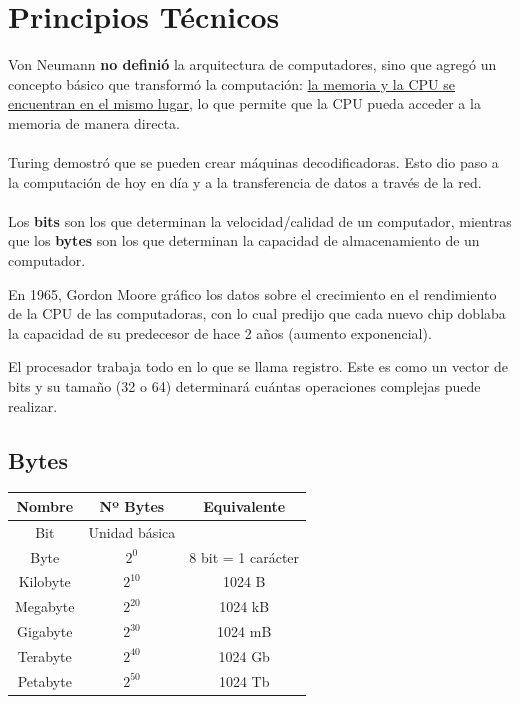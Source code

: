 \documentclass{templateNote}
\begin{document}
\section{Principios Técnicos}
\noindent Von Neumann \textbf{no definió} la arquitectura de computadores, sino que agregó un concepto básico que transformó la computación: \underline{la memoria y la CPU se encuentran en el mismo lugar}, lo que permite que la CPU pueda acceder a la memoria de manera directa. 
\\\\
Turing demostró que se pueden crear máquinas decodificadoras. Esto dio paso a la computación de hoy en día y a la transferencia de datos a través de la red.
\\\\
Los \textbf{bits} son los que determinan la velocidad/calidad de un computador, mientras que los \textbf{bytes} son los que determinan la capacidad de almacenamiento de un computador.

\begin{tcolorbox}[colback=blue!5!white,colframe=blue!75!black,title=Ley de Moore]
En 1965, Gordon Moore gráfico los datos sobre el crecimiento en el rendimiento de la CPU de las computadoras, con lo cual predijo que cada nuevo chip doblaba la capacidad de su predecesor de hace 2 años (aumento exponencial).
\end{tcolorbox}

\noindent El procesador trabaja todo en lo que se llama registro. Este es como un vector de bits y su tamaño (32 o 64) determinará cuántas operaciones complejas puede realizar.

\subsection{Bytes}
\begin{table} [h]
    \centering
        \renewcommand{\arraystretch}{1.5} %
        \begin{tabular}{|c|c|c|}
            \hline
            \textbf{Nombre} & \textbf{Nº Bytes} & \textbf{Equivalente}\\
            \hline
            Bit & Unidad básica &\\
            \hline
            Byte & $\displaystyle 2^0$ & 8 bit = 1 carácter \\
            \hline
            Kilobyte & $\displaystyle 2^{10}$ & 1024 B \\
            \hline
            Megabyte & $\displaystyle 2^{20}$ & 1024 kB \\
            \hline
            Gigabyte & $\displaystyle 2^{30}$ & 1024 mB \\
            \hline
            Terabyte & $\displaystyle 2^{40}$ & 1024 Gb \\
            \hline
            Petabyte & $\displaystyle 2^{50}$ & 1024 Tb \\
            \hline
        \end{tabular}
    \label{tab:componentes}
\end{table}
\end{document}
